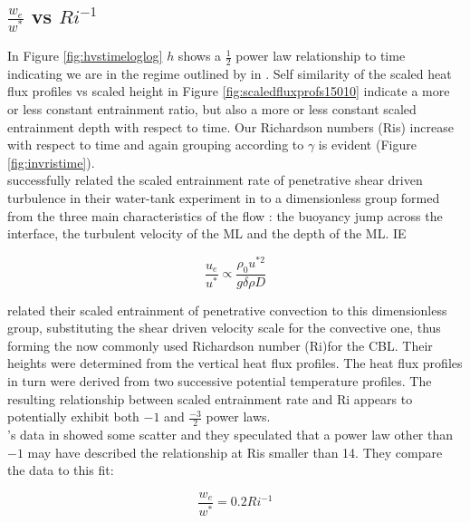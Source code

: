 \subsection{$\frac{w_{e}}{w^{*}}$ vs $Ri^{-1}$}
\FloatBarrier

In Figure \ref{fig:hvstimeloglog} $h$ shows a $\frac{1}{2}$ power law relationship to time indicating we are in the regime outlined by \citeauthor{FedConzMir04} in \cite{FedConzMir04}.  Self similarity of the scaled heat flux profiles vs scaled height in Figure \ref{fig:scaledfluxprofs15010} indicate a more or less constant entrainment ratio, but also a more or less constant scaled entrainment depth with respect to time. Our Richardson numbers (\acs{Ri}s) increase with respect to time and again grouping according to $\gamma$ is evident (Figure \ref{fig:invristime}).\\


\citeauthor{KatoPhil} successfully related
the scaled entrainment rate of penetrative shear driven turbulence
in their water-tank experiment in \cite{KatoPhil}
to a  dimensionless group formed from the three main characteristics
of the flow : the buoyancy jump across the interface, the turbulent velocity of the \acs{ML} and the depth of the \acs{ML}. IE

\begin{equation}
\frac{u_{e}}{u^{*}} \propto \frac{\rho_{0} u^{*2}}{g \delta \rho D} 
\end{equation}

\citeauthor{DearWill80} related their scaled entrainment of penetrative convection to this dimensionless group, substituting the shear driven velocity scale for the convective one, thus forming the now commonly used Richardson number (\acs{Ri})for the \acs{CBL}.  Their heights were determined from the vertical heat flux profiles.  The heat flux profiles in turn were derived from two successive potential temperature profiles.  The resulting relationship between scaled entrainment rate and \acs{Ri} appears to potentially exhibit both $-1$ and $\frac{-3}{2}$ power laws.\\

\citeauthor{SullMoengStev}'s data in \cite{SullMoengStev} showed some scatter and they speculated that a power law other than $-1$ may have described the relationship at \acs{Ri}s smaller than 14.  They compare the data to this fit:

\begin{equation}
\frac{w_{e}}{w^{*}}=0.2 Ri^{-1}
\end{equation}

